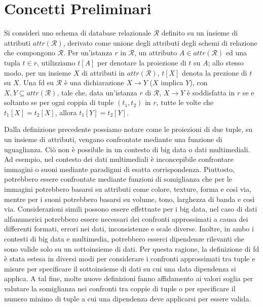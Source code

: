 \section{Concetti Preliminari} %
Si consideri uno schema di database relazionale $\mathcal{R}$ definito su un insieme di attributi $attr(\mathcal{R})$, derivato come unione degli attributi degli schemi di relazione che compongono $\mathcal{R}$. Per un'istanza $r$ in $\mathcal{R}$, un attributo $A \in attr(\mathcal{R})$ ed una tupla $t \in r$, utilizziamo $t[A]$ per denotare la proiezione di $t$ su $A$; allo stesso modo, per un insieme $X$ di attributi in $attr(\mathcal{R})$, $t[X]$ denota la prezione di $t$ su $X$. Una \acrshort{fd} su $\mathcal{R}$ \`{e} una dichiarazione $X \rightarrow Y$ ($X$ implica $Y$), con $X, Y \subseteq attr(\mathcal{R})$, tale che, data un'istanza $r$ di $\mathcal{R}$, $X \rightarrow Y$ \`{e} soddisfatta in $r$ se e soltanto se per ogni coppia di tuple $(t_1, t_2)$ in $r$, tutte le volte che $t_1[X]=t_2[X]$, allora $t_1[Y]=t_2[Y]$.\par
Dalla definizione precedente possiamo notare come le proiezioni di due tuple, su un insieme di attributi, vengano confrontate mediante una funzione di uguaglianza. Ci\`{o} non \`{e} possibile in un contesto di big data o dati multimediali. Ad esempio, nel contesto dei dati multimediali \`{e} inconcepibile confrontare immagini o suoni mediante paradigmi di esatta corrispondenza. Piuttosto, potrebbero essere confrontate mediante funzioni di somiglianza che per le immagini potrebbero basarsi su attributi come colore, texture, forma e cos\`{i} via, mentre per i suoni potrebbero basarsi su volume, tono, larghezza di banda e cos\`{i} via. Considerazioni simili possono essere effettuate per i big data, nel caso di dati alfanumerici potrebbero essere necessari dei confronti approssimati a causa dei differenti formati, errori nei dati, inconsistenze e scale diverse. Inoltre, in ambo i contesti di big data e multimedia, potrebbero esserci dipendenze rilevanti che sono valide solo su un sottoinsieme di dati. Per questa ragione, la definizione di \acrshort{fd} \`{e} stata estesa in diversi modi per considerare i confronti approssimati tra tuple e misure per specificare il sottoinsieme di dati su cui una data dipendenza si applica. A tal fine, molte nuove definizioni fanno affidamento ai valori soglia per valutare la somiglianza nei confronti tra coppie di tuple o per specificare il numero minimo di tuple a cui una dipendenza deve applicarsi per essere valida.

